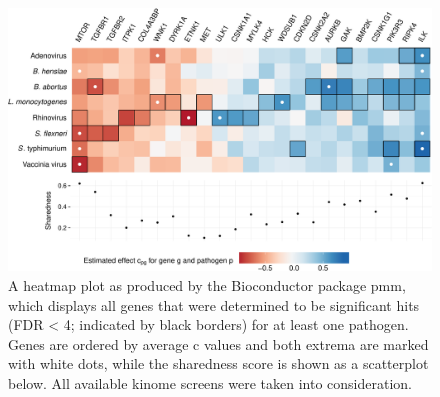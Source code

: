 

\begin{knitrout}
\color{fgcolor}\begin{figure}

{\centering \includegraphics[width=.95\linewidth]{figures/R/pmm-pmm-heatmap-1} 

}

\caption[Heatmap plot showing significant genes for InfectX kinome screens as determined by pmm.]{A heatmap plot as produced by the Bioconductor package pmm, which displays all genes that were determined to be significant hits (FDR < 4; indicated by black borders) for at least one pathogen. Genes are ordered by average c values and both extrema are marked with white dots, while the sharedness score is shown as a scatterplot below. All available kinome screens were taken into consideration.}\label{fig:pmm-heatmap}
\end{figure}


\end{knitrout}


